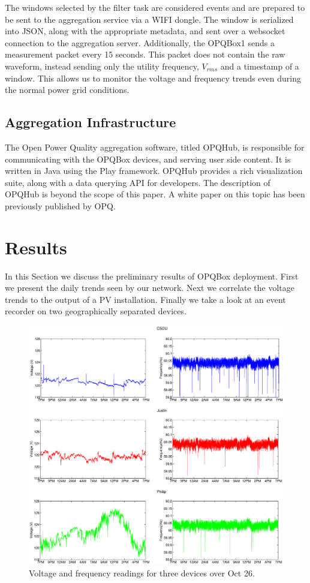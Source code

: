 The windows selected by the filter task are considered events and are prepared to be sent to the aggregation service via a WIFI dongle. The window is serialized into JSON, along with the appropriate metadata, and sent over a websocket connection to the aggregation server. Additionally, the OPQBox1 sends a measurement packet every 15 seconds. This packet does not contain the raw waveform, instead sending only the utility frequency, $V_{rms}$ and a timestamp of a window. This allows us to monitor the voltage and frequency trends even during the normal power grid conditions. 

\subsection{Aggregation Infrastructure}
The Open Power Quality aggregation software, titled OPQHub, is responsible for communicating with the OPQBox devices, and serving user side content. It is written in Java using the Play framework. OPQHub provides a rich visualization suite, along with a data querying API for developers. The description of OPQHub is beyond the scope of this paper. A white paper on this topic has been previously published by OPQ.\cite{tony}

\section{Results}

In this Section we discuss the preliminary results of  OPQBox deployment. First we present the daily trends seen by our network. Next we correlate the voltage trends to the output
of a PV installation. Finally we take a look at an event recorder on two geographically separated devices.

\begin{figure}[h!]
\centering
\includegraphics[width=\textwidth]{img/1Day.eps}
\caption{Voltage and frequency readings for three devices over Oct 26.}
\label{fig:trends}
\end{figure}


